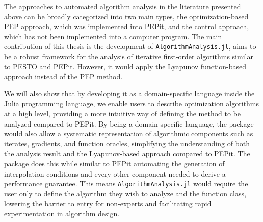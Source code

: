The approaches to automated algorithm analysis in the literature presented above can be broadly categorized into two main types, the optimization-based PEP approach, which was implemented into PEPit, and the control approach, which has not been implemented into a computer program. The main contribution of this thesis is the development of \texttt{AlgorithmAnalysis.jl}, aims to be a robust framework for the analysis of iterative first-order algorithms similar to PESTO and PEPit. However, it would apply the Lyapunov function-based approach instead of the PEP method.

We will also show that by developing it as a domain-specific language inside the Julia programming language, we enable users to describe optimization algorithms at a high level, providing a more intuitive way of defining the method to be analyzed compared to PEPit. By being a domain-specific language, the package would also allow a systematic representation of algorithmic components such as iterates, gradients, and function oracles, simplifying the understanding of both the analysis result and the Lyapunov-based approach compared to PEPit. The package does this while similar to PEPit automating the generation of interpolation conditions and every other component needed to derive a performance guarantee. This means \texttt{AlgorithmAnalysis.jl} would require the user only to define the algorithm they wish to analyze and the function class, lowering the barrier to entry for non-experts and facilitating rapid experimentation in algorithm design.